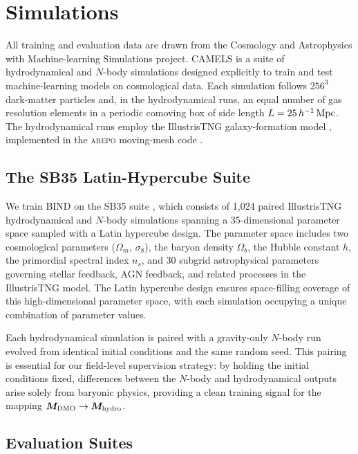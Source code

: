 \documentclass[linenumbers,trackchanges, twocolumn]{aastex701}
\begin{document}
\section{Simulations}
\label{sec:simulations}

All training and evaluation data are drawn from the
Cosmology and Astrophysics with Machine-learning Simulations
\citep[CAMELS;][]{villaescusa2021camels} project.
CAMELS is a suite of hydrodynamical and $N$-body simulations designed
explicitly to train and test machine-learning models on cosmological
data. Each simulation follows \(256^3\) dark-matter particles and,
in the hydrodynamical runs, an equal number of gas resolution elements
in a periodic comoving box of side length $L = 25\,h^{-1}\,{\rm Mpc}$.
The hydrodynamical runs employ the IllustrisTNG galaxy-formation model
\citep{weinberger2017supermassive,pillepich2018simulating}, implemented
in the \textsc{arepo} moving-mesh code \citep{springel2010arepo}.

\subsection{The SB35 Latin-Hypercube Suite}
\label{subsec:sb35}

We train \textsc{BIND} on the SB35 suite \citep{camels_parameters},
which consists of 1{,}024 paired IllustrisTNG hydrodynamical and
$N$-body simulations spanning a 35-dimensional parameter space sampled
with a Latin hypercube design. The parameter space includes two
cosmological parameters ($\Omega_m$, $\sigma_8$), the baryon density
$\Omega_b$, the Hubble constant $h$, the primordial spectral index
$n_s$, and 30 subgrid astrophysical parameters governing stellar
feedback, AGN feedback, and related processes in the IllustrisTNG model.
The Latin hypercube design ensures space-filling coverage of this
high-dimensional parameter space, with each simulation occupying a
unique combination of parameter values.

Each hydrodynamical simulation is paired with a gravity-only $N$-body
run evolved from identical initial conditions and the same random seed.
This pairing is essential for our field-level supervision strategy:
by holding the initial conditions fixed, differences between the
$N$-body and hydrodynamical outputs arise solely from baryonic physics,
providing a clean training signal for the mapping
$\bm{M}_{\rm DMO} \rightarrow \bm{M}_{\rm hydro}$.

\subsection{Evaluation Suites}
\label{subsec:eval_suites}
\end{document}
